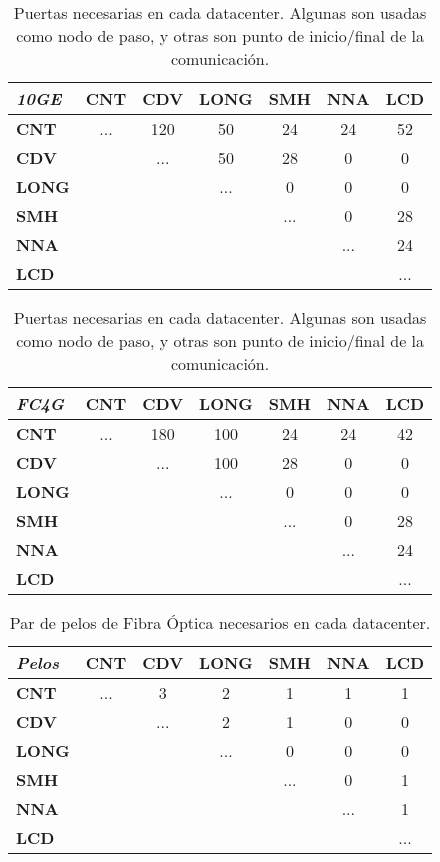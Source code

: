 \begin{table}[!hbt]
\centering
\begin{tabular}{||l | c  c  c  c  c  c||}
\hline
\hline
 \textbf{\textit{10GE}}& \textbf{CNT} & \textbf{CDV} & \textbf{LONG} & \textbf{SMH} & \textbf{NNA} & \textbf{LCD}  \\
\hline
\textbf{CNT} & ... & 120 & 50 & 24 & 24 & 52\\
\hline
\textbf{CDV} &  & ... & 50 & 28 & 0 & 0\\
\hline
\textbf{LONG} &  &  & ... & 0 & 0 & 0\\
\hline
\textbf{SMH} &  &  &  & ... & 0 & 28\\
\hline
\textbf{NNA} & & & & & ... & 24\\
\hline
\textbf{LCD} & & & & & & ... \\
\hline
\end{tabular}

\vspace*{5pt}

\begin{tabular}{||l | c  c  c  c  c  c||}
\hline
\hline
 \textbf{\textit{FC4G}}& \textbf{CNT} & \textbf{CDV} & \textbf{LONG} & \textbf{SMH} & \textbf{NNA} & \textbf{LCD}  \\
\hline
\textbf{CNT} & ... & 180 & 100 & 24 & 24 & 42\\
\hline
\textbf{CDV} &  & ... & 100 & 28 & 0 & 0\\
\hline
\textbf{LONG} &  &  & ... & 0 & 0 & 0\\
\hline
\textbf{SMH} &  &  &  & ... & 0 & 28\\
\hline
\textbf{NNA} & & & & & ... & 24\\
\hline
\textbf{LCD} & & & & & & ... \\
\hline
\end{tabular}
\caption[Puertas de cada DataCenter]{Puertas necesarias en cada datacenter. Algunas son usadas como nodo de paso, y otras son punto de inicio/final de la comunicación.}
\label{tab:puertas}
\end{table}

\begin{table}[!hbt]
\centering
\begin{tabular}{||l | c  c  c  c  c  c||}
\hline
\hline
 \textbf{\textit{Pelos}}& \textbf{CNT} & \textbf{CDV} & \textbf{LONG} & \textbf{SMH} & \textbf{NNA} & \textbf{LCD}  \\
\hline
\textbf{CNT} & ... & 3 & 2 & 1 & 1 & 1\\
\hline
\textbf{CDV} &  & ... & 2 & 1 & 0 & 0\\
\hline
\textbf{LONG} &  &  & ... & 0 & 0 & 0\\
\hline
\textbf{SMH} &  &  &  & ... & 0 & 1\\
\hline
\textbf{NNA} & & & & & ... & 1\\
\hline
\textbf{LCD} & & & & & & ... \\
\hline
\end{tabular}
\caption[Fibras de cada DataCenter]{Par de pelos de Fibra Óptica necesarios en cada datacenter.}
\label{tab:pelos}
\end{table}


